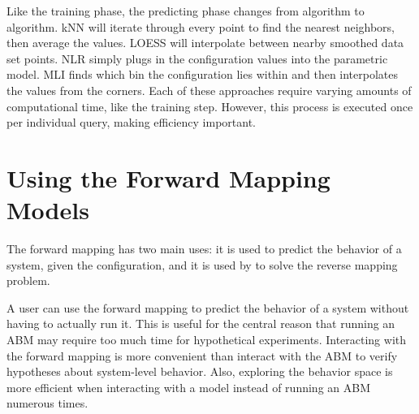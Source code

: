 Like the training phase, the predicting phase changes from algorithm to algorithm.
kNN will iterate through every point to find the nearest neighbors, then average the values.
LOESS will interpolate between nearby smoothed data set points.
NLR simply plugs in the configuration values into the parametric model.
MLI finds which bin the configuration lies within and then interpolates the values from the corners.
Each of these approaches require varying amounts of computational time, like the training step.
However, this process is executed once per individual query, making efficiency important.


\section{Using the Forward Mapping Models}

The forward mapping has two main uses: it is used to predict the behavior of a system, given the configuration, and it is used by \fw to solve the reverse mapping problem.

A user can use the forward mapping to predict the behavior of a system without having to actually run it.
This is useful for the central reason that running an ABM may require too much time for hypothetical experiments.
Interacting with the forward mapping is more convenient than interact with the ABM to verify hypotheses about system-level behavior.
Also, exploring the behavior space is more efficient when interacting with a model instead of running an ABM numerous times.


